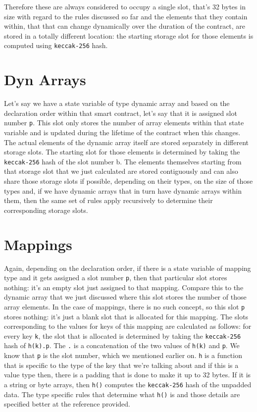 Therefore these are always considered to occupy a single slot, that's 32 bytes in size with regard to the rules discussed so far and the elements that they contain within, that that can change dynamically over the duration of the contract, are stored in a totally different location: the starting storage slot for those elements is computed using \verb|keccak-256| hash.

\section{Dyn Arrays}
Let's say we have a state variable of type dynamic array and  based on the declaration order within that smart contract, let's say that it is assigned slot number \verb|p|. This slot only stores the number of array elements within that state variable and is updated during the lifetime of the contract when this changes. The actual elements of the dynamic array itself are stored separately in different storage slots. The starting slot for those elements is determined by taking the \verb|keccak-256| hash of the slot number b. The elements themselves starting from that storage slot that we just calculated are stored contiguously and can also share those storage slots if possible, depending on their types, on the size of those types and, if we have dynamic arrays that in turn have dynamic arrays within them, then the same set of rules apply recursively to determine their corresponding storage slots.

\section{Mappings}
Again, depending on the declaration order, if there is a state variable of mapping type and it gets assigned a slot number \verb|p|, then that particular slot stores nothing: it's an empty slot just assigned to that mapping. Compare this to the dynamic array that we just discussed where this slot stores the number of those array elements. In the case of mappings, there is no such concept, so this slot \verb|p| stores nothing: it's just a blank slot that is allocated for this mapping. The slots corresponding to the values for keys of this mapping are calculated as follows: for every key \verb|k|, the slot that is allocated is determined by taking the \verb|keccak-256| hash of \verb|h(k).p|. The \verb|.| is a concatenation of the two values of \verb|h(k)| and \verb|p|. We know that \verb|p| is the slot number, which we mentioned earlier on. \verb|h| is a function that is specific to the type of the key that we're talking about and if this is a value type then, there is a padding that is done to make it up to 32 bytes. If it is a string or byte arrays, then \verb|h()| computes the \verb|keccak-256| hash of the unpadded data. The type specific rules that determine what \verb|h()| is and those details are specified better at the reference provided.

